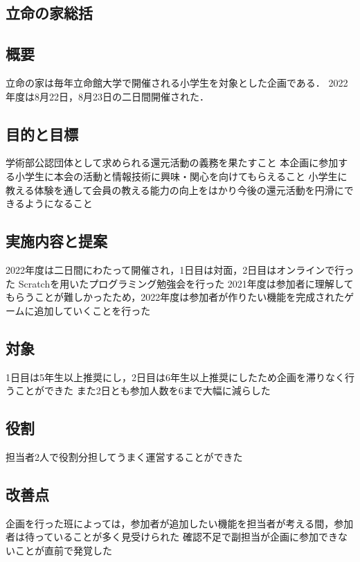 \subsection*{立命の家総括}


\subsection*{概要}
立命の家は毎年立命館大学で開催される小学生を対象とした企画である．
2022年度は8月22日，8月23日の二日間開催された．

\subsection*{目的と目標}
学術部公認団体として求められる還元活動の義務を果たすこと
本企画に参加する小学生に本会の活動と情報技術に興味・関心を向けてもらえること
小学生に教える体験を通して会員の教える能力の向上をはかり今後の還元活動を円滑にできるようになること

\subsection*{実施内容と提案}
2022年度は二日間にわたって開催され，1日目は対面，2日目はオンラインで行った
Scratchを用いたプログラミング勉強会を行った
2021年度は参加者に理解してもらうことが難しかったため，2022年度は参加者が作りたい機能を完成されたゲームに追加していくことを行った

\subsection*{対象}
1日目は5年生以上推奨にし，2日目は6年生以上推奨にしたため企画を滞りなく行うことができた
また2日とも参加人数を6まで大幅に減らした

\subsection*{役割}
担当者2人で役割分担してうまく運営することができた

\subsection*{改善点}
企画を行った班によっては，参加者が追加したい機能を担当者が考える間，参加者は待っていることが多く見受けられた
確認不足で副担当が企画に参加できないことが直前で発覚した
